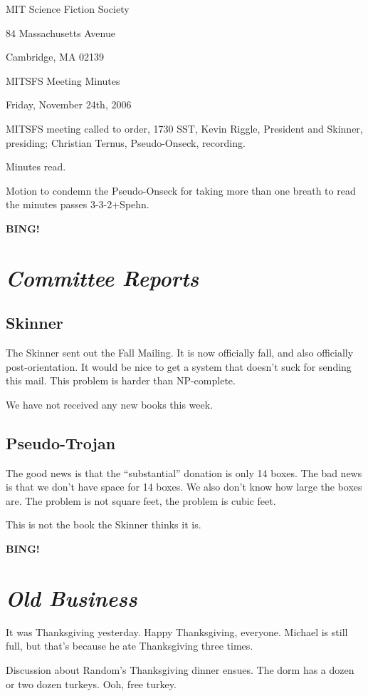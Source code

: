 \documentclass[10pt]{article}
\newcommand{\bing}{{\bf BING!} }
\newcommand{\goto}[1]{\bing \vskip 12pt \section*{{\em{#1}}}}
\begin{document}
\begin{center}

MIT Science Fiction Society

84 Massachusetts Avenue

Cambridge, MA 02139

\vspace{12pt}

MITSFS Meeting Minutes

Friday, November 24th, 2006

\end{center}

\vspace{18pt}

\setlength{\parskip}{6pt}

\noindent
MITSFS meeting called to order, 1730 SST,
Kevin Riggle, President and Skinner, presiding; Christian Ternus, Pseudo-Onseck, recording.

Minutes read.

Motion to condemn the Pseudo-Onseck for taking more than one breath to read the minutes passes 3-3-2+Spehn.

\goto{Committee Reports}

\subsection*{Skinner}
The Skinner sent out the Fall Mailing. It is now officially fall, and also officially post-orientation. It would be nice to get a system that doesn't suck for sending this mail. This problem is harder than NP-complete.

We have not received any new books this week.

\subsection*{Pseudo-Trojan}
The good news is that the ``substantial'' donation is only 14 boxes. The bad news is that we don't have space for 14 boxes. We also don't know how large the boxes are. The problem is not square feet, the problem is cubic feet.

This is not the book the Skinner thinks it is.

\goto{Old Business}

It was Thanksgiving yesterday. Happy Thanksgiving, everyone. Michael is still full, but that's because he ate Thanksgiving three times. 

Discussion about Random's Thanksgiving dinner ensues. The dorm has a dozen or two dozen turkeys. Ooh, free turkey.
\end{document}
